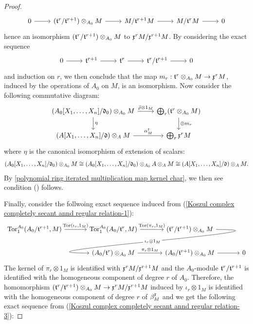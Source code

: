 \begin{proof}
\begin{equation}\label{Koszul complex completely secant annd regular relation-2}
\begin{tikzcd}
0\ar[r]&(\t^r/\t^{r+1})\otimes_{A_0}M\ar[r]&M/\t^{r+1}M\ar[r]&M/\t^rM\ar[r]&0
\end{tikzcd}
\end{equation}
hence an isomorphism $(\mathfrak{t}^r/\mathfrak{t}^{r+1})\otimes_{A_0}M$ to $\mathfrak{x}^rM/\mathfrak{x}^{r+1}M$. By considering the exact sequence
\[\begin{tikzcd}
0\ar[r]&\t^{r+1}\ar[r]&\t^r\ar[r]&\t^r/\t^{r+1}\ar[r]&0
\end{tikzcd}\]
and induction on $r$, we then conclude that the map $m_r:\mathfrak{t}^r\otimes_{A_0}M\to\mathfrak{x}^rM$, induced by the operations of $A_0$ on $M$, is an isomorphism. Now consider the following commutative diagram:
\[\begin{tikzcd}
(A_0[X_1,\dots,X_n]/\d_0)\otimes_{A_0}M\ar[r,"\bar{\rho}\otimes 1_M"]\ar[d,"\eta"]&\bigoplus_r(\t^r\otimes_{A_0}M)\ar[d,"\oplus m_r"]\\
(A[X_1,\dots,X_n]/\d)\otimes_AM\ar[r,"\alpha_M^\x"]&\bigoplus_r\x^rM
\end{tikzcd}\]
where $\eta$ is the canonical isomorphism of extension of scalars:
\[(A_0[X_1,\dots,X_n]/\mathfrak{d}_0)\otimes_{A_0}M\cong (A_0[X_1,\dots,X_n]/\mathfrak{d}_0)\otimes_{A_0}A\otimes_AM\cong(A[X_1,\dots,X_n]/\mathfrak{d})\otimes_AM.\]
By \cref{polynomial ring iterated multiplication map kernel char}, we then see condition () follows.\par
Finally, consider the follwoing exact sequence induced from (\ref{Koszul complex completely secant annd regular relation-1}):
\begin{equation}\label{Koszul complex completely secant annd regular relation-3}
\begin{tikzcd}[column sep=12mm]
\Tor_1^{A_0}(A_0/\t^{r+1},M)\ar[r,"{\Tor(\iota_r,1_M)}"]&\Tor_1^{A_0}(A_0/\t^r,M)\ar[r,"{\Tor(\pi_r,1_M)}"]&(\t^r/\t^{r+1})\otimes_{A_0}M\ar[out=0, in=180, looseness=2, overlay,"\iota_r\otimes 1_M"description]{dl}\\
&(A_0/\t^{r})\otimes_{A_0}M\ar[r,"\pi_r\otimes 1_M"]&(A_0/\t^{r+1})\otimes_{A_0}M\ar[r]&0
\end{tikzcd}
\end{equation}
The kernel of $\pi_r\otimes 1_M$ is identified with $\mathfrak{x}^rM/\mathfrak{x}^{r+1}M$ and the $A_0$-module $\mathfrak{t}^r/\mathfrak{t}^{r+1}$ is identified with the homogeneous component of degree $r$ of $A_0$. Therefore, the homomorphism $(\mathfrak{t}^r/\mathfrak{t}^{r+1})\otimes_{A_0}M\to\mathfrak{x}^rM/\mathfrak{x}^{r+1}M$ induced by $\iota_r\otimes 1_M$ is identified with the homogeneous component of degree $r$ of $\beta_M^{\mathfrak{x}}$ and we get the following exact sequence from (\ref{Koszul complex completely secant annd regular relation-3}):

\end{proof}
